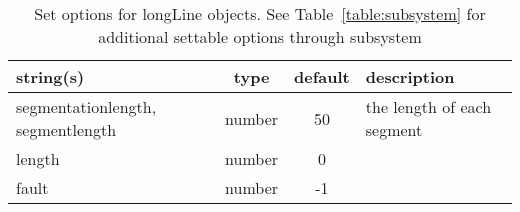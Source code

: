 \begin{table}[ht]
\centering
\begin{tabular}{p{5cm} c c p{7cm}}
\hline
string(s) & type & default & description \\
\hline
segmentationlength, segmentlength & number & 50 & the length of each segment\\
length & number & 0 & \\
fault & number & -1 & \\
\hline
\end{tabular}
\caption{Set options for longLine objects. See Table~\ref{table:subsystem} for additional settable options through subsystem}
\label{table:longLine}
\end{table}
